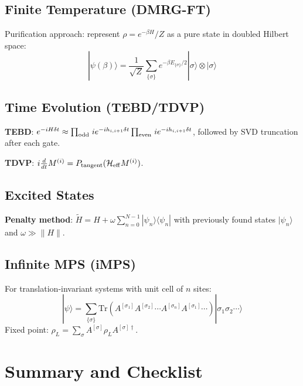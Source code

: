 \documentclass[aps,prb,onecolumn,scriptaddress]{revtex4-2}
\newcommand{\Tr}{\mathrm{Tr}}
\begin{document}
	\subsection{Finite Temperature (DMRG-FT)}
	
	Purification approach: represent $\rho = e^{-\beta H}/Z$ as a pure state
	in doubled Hilbert space:
	\begin{equation}
		|\psi(\beta)\rangle = \frac{1}{\sqrt{Z}}
		\sum_{\{\sigma\}} e^{-\beta E_{\{\sigma\}}/2}
		|\sigma\rangle \otimes |\sigma\rangle
	\end{equation}
	
	\subsection{Time Evolution (TEBD/TDVP)}
	
	\textbf{TEBD}:
	$e^{-iH\delta t} \approx
	\prod_{\rm odd\,}i e^{-ih_{i,i+1}\delta t}
	\prod_{\rm even\,}i e^{-ih_{i,i+1}\delta t}$,
	followed by SVD truncation after each gate.
	
	\textbf{TDVP}: $i\frac{d}{dt}M^{(i)} = P_{\rm tangent}(\mathcal{H}_{\rm eff}M^{(i)})$.
	
	\subsection{Excited States}
	
	\textbf{Penalty method}:
	$\tilde{H} = H + \omega\sum_{n=0}^{N-1}|\psi_n\rangle\langle\psi_n|$
	with previously found states $|\psi_n\rangle$ and $\omega \gg \|H\|$.
	
	\subsection{Infinite MPS (iMPS)}
	
	For translation-invariant systems with unit cell of $n$ sites:
	\begin{equation}
		|\psi\rangle = \sum_{\{\sigma\}}
		\Tr\!\left(A^{[\sigma_1]} A^{[\sigma_2]} \cdots A^{[\sigma_n]}
		A^{[\sigma_1]} \cdots\right)
		|\sigma_1\sigma_2\cdots\rangle
	\end{equation}
	Fixed point: $\rho_L = \sum_\sigma A^{[\sigma]}\rho_L A^{[\sigma]\dagger}$.
	
	\clearpage
	\section{Summary and Checklist}
	
\end{document}
